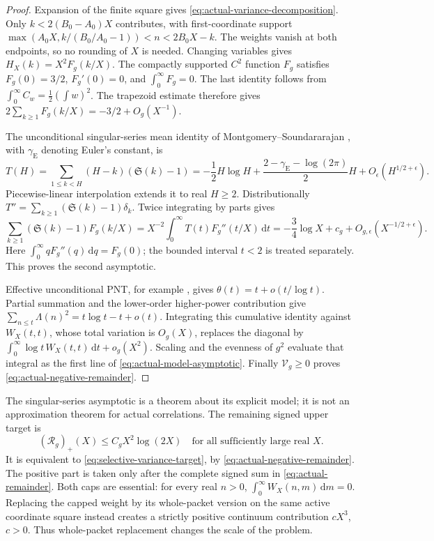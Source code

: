 \documentclass[11pt]{article}
\numberwithin{equation}{section}
\theoremstyle{definition}
\theoremstyle{remark}
\newcommand{\dd}{\,\mathrm d}
\begin{document}
\begin{proof}
Expansion of the finite square gives
\eqref{eq:actual-variance-decomposition}. Only
\(k<2(B_0-A_0)X\) contributes, with first-coordinate support
\(\max(A_0X,k/(B_0/A_0-1))<n<2B_0X-k\).
The weights vanish at both endpoints, so no rounding of \(X\) is needed.
Changing variables gives \(H_X(k)=X^2F_g(k/X)\).
The compactly supported \(C^2\) function \(F_g\) satisfies
\(F_g(0)=3/2\), \(F_g'(0)=0\), and \(\int_0^\infty F_g=0\).
The last identity follows from \(\int_0^\infty C_w=\tfrac12(\int w)^2\).
The trapezoid estimate therefore gives
\(2\sum_{k\ge1}F_g(k/X)=-3/2+O_g(X^{-1})\).

The unconditional singular-series mean identity of
Montgomery--Soundararajan \cite[eq.~(16)]{MontgomerySoundararajan},
with \(\gamma_{\mathrm E}\) denoting Euler's constant, is
\[
T(H)=\sum_{1\le k<H}(H-k)(\mathfrak S(k)-1)
=-\frac12H\log H+\frac{2-\gamma_{\mathrm E}-\log(2\pi)}2H
+O_\epsilon(H^{1/2+\epsilon}).
\]
Piecewise-linear interpolation extends it to real \(H\ge2\).
Distributionally \(T''=\sum_{k\ge1}(\mathfrak S(k)-1)\delta_k\).
Twice integrating by parts gives
\[
\sum_{k\ge1}(\mathfrak S(k)-1)F_g(k/X)
=X^{-2}\int_0^\infty T(t)F_g''(t/X)\dd t
=-\frac34\log X+c_g+O_{g,\epsilon}(X^{-1/2+\epsilon}).
\]
Here \(\int_0^\infty qF_g''(q)\dd q=F_g(0)\); the bounded interval
\(t<2\) is treated separately. This proves the second asymptotic.

Effective unconditional PNT, for example \cite{PlattTrudgianPNT}, gives
\(\theta(t)=t+o(t/\log t)\). Partial summation and the lower-order
higher-power contribution give
\(\sum_{n\le t}\Lambda(n)^2=t\log t-t+o(t)\).
Integrating this cumulative identity against \(W_X(t,t)\), whose total
variation is \(O_g(X)\), replaces the diagonal by
\(\int_0^\infty\log t\,W_X(t,t)\dd t+o_g(X^2)\).
Scaling and the evenness of \(g^2\) evaluate that integral as the first
line of \eqref{eq:actual-model-asymptotic}. Finally
\(\mathcal V_g\ge0\) proves \eqref{eq:actual-negative-remainder}.
\end{proof}

The singular-series asymptotic is a theorem about its explicit model;
it is not an approximation theorem for actual correlations.
The remaining signed upper target is
\begin{equation}\label{eq:actual-positive-target}
(\mathcal R_g)_+(X)\le C_gX^2\log(2X)
\quad\text{for all sufficiently large real }X.
\end{equation}
It is equivalent to \eqref{eq:selective-variance-target}, by
\eqref{eq:actual-negative-remainder}. The positive part is taken only
after the complete signed sum in \eqref{eq:actual-remainder}.
Both caps are essential: for every real \(n>0\),
\(\int_0^\infty W_X(n,m)\dd m=0\). Replacing the capped weight by
its whole-packet version on the same active coordinate square instead
creates a strictly positive continuum contribution \(cX^3\), \(c>0\).
Thus whole-packet replacement changes the scale of the problem.
\end{document}
